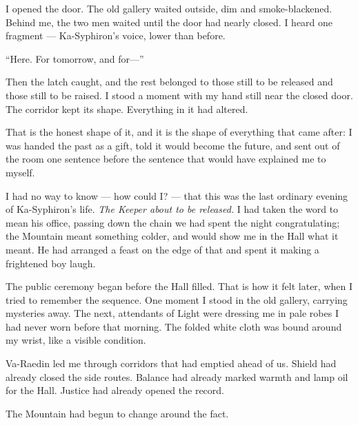 I opened the door.
The old gallery waited outside, dim and smoke-blackened. Behind me, the two men waited until the door had nearly closed. I heard one fragment --- Ka-Syphiron's voice, lower than before.\par

``Here. For tomorrow, and for---''\par

Then the latch caught, and the rest belonged to those still to be released and those still to be raised.
I stood a moment with my hand still near the closed door. The corridor kept its shape. Everything in it had altered.\par

That is the honest shape of it, and it is the shape of everything that came after: I was handed the past as a gift, told it would become the future, and sent out of the room one sentence before the sentence that would have explained me to myself.\par

I had no way to know --- how could I? --- that this was the last ordinary evening of Ka-Syphiron's life. \emph{The Keeper about to be released.} I had taken the word to mean his office, passing down the chain we had spent the night congratulating; the Mountain meant something colder, and would show me in the Hall what it meant. He had arranged a feast on the edge of that and spent it making a frightened boy laugh.\par

The public ceremony began before the Hall filled.
That is how it felt later, when I tried to remember the sequence. One moment I stood in the old gallery, carrying mysteries away. The next, attendants of Light were dressing me in pale robes I had never worn before that morning. The folded white cloth was bound around my wrist, like a visible condition.\par

Va-Raedin led me through corridors that had emptied ahead of us. Shield had already closed the side routes. Balance had already marked warmth and lamp oil for the Hall. Justice had already opened the record.\par

The Mountain had begun to change around the fact.\par

\ornament
